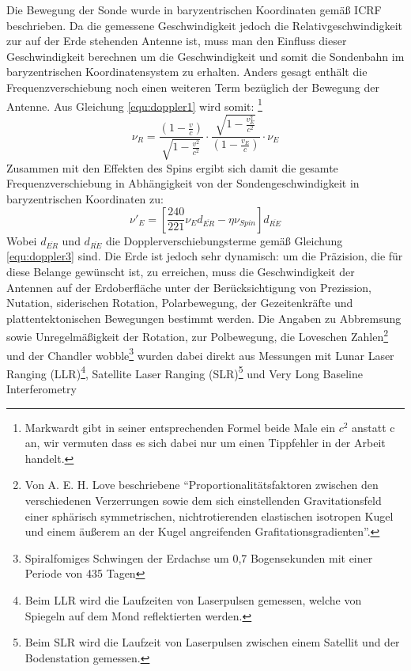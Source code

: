 Die Bewegung der Sonde wurde in baryzentrischen Koordinaten gemäß ICRF beschrieben. %
Da die gemessene Geschwindigkeit jedoch die Relativgeschwindigkeit zur auf der Erde stehenden Antenne ist,
muss man den Einfluss dieser Geschwindigkeit berechnen um die Geschwindigkeit und somit die Sondenbahn im baryzentrischen Koordinatensystem zu erhalten.
Anders gesagt enthält die Frequenzverschiebung noch einen weiteren Term bezüglich der Bewegung der Antenne. Aus Gleichung \ref{equ:doppler1} wird somit:
\footnote{Markwardt gibt in seiner entsprechenden Formel beide Male ein $c^2$ anstatt c an, wir vermuten dass es sich dabei nur um einen Tippfehler in der Arbeit handelt.}
\begin{equation}
\label{equ:doppler3}
 \nu_R = \frac{(1-\frac{v}{c})}{\sqrt{1-\frac{v^2}{c^2}}} \cdot \frac{\sqrt{1-\frac{v_E^2}{c^2}}}{(1-\frac{v_E}{c})} \cdot \nu_E 
\end{equation}
Zusammen mit den Effekten des Spins ergibt sich damit die gesamte Frequenzverschiebung in Abhängigkeit von der Sondengeschwindigkeit in baryzentrischen Koordinaten zu:
\begin{equation}
 \nu'_E = \left[ \frac{240}{221} \nu_E d_{\overline{ER}} - \eta \nu_{Spin} \right]  d_{\overline{RE}}
\end{equation}
Wobei $d_{\overline{ER}}$ und $d_{\overline{RE}}$ die Dopplerverschiebungsterme gemäß Gleichung \ref{equ:doppler3} sind.
Die Erde ist jedoch sehr dynamisch: um die Präzision, die für diese Belange gewünscht ist, zu erreichen, muss die Geschwindigkeit der Antennen auf der Erdoberfläche unter der Berücksichtigung von Prezission, Nutation,
siderischen Rotation, Polarbewegung, der Gezeitenkräfte und plattentektonischen Bewegungen bestimmt werden.
Die Angaben zu Abbremsung sowie Unregelmäßigkeit der Rotation, zur Polbewegung, die Loveschen Zahlen\footnote{Von A. E. H. Love beschriebene ``Proportionalitätsfaktoren zwischen den verschiedenen Verzerrungen sowie dem sich einstellenden Gravitationsfeld einer sphärisch symmetrischen, nichtrotierenden elastischen isotropen Kugel und einem äußerem an der Kugel angreifenden Grafitationsgradienten''\cite{Dittus2006}.} und der Chandler wobble\footnote{Spiralfomiges Schwingen
der Erdachse um 0,7 Bogensekunden mit einer Periode von 435 Tagen} %
wurden dabei direkt aus Messungen mit Lunar Laser Ranging (LLR)\footnote{Beim LLR wird die Laufzeiten von Laserpulsen gemessen, welche von Spiegeln auf dem Mond reflektierten werden.},
Satellite Laser Ranging (SLR)\footnote{Beim SLR wird die Laufzeit von Laserpulsen zwischen einem Satellit und der Bodenstation gemessen.} und Very Long Baseline Interferometry
